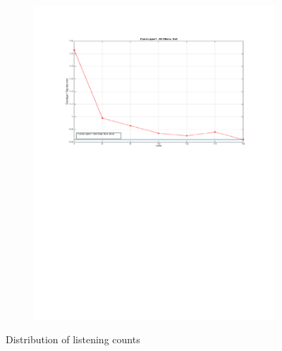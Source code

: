 \documentclass{article} %
\begin{document}
\begin{figure}[h]
\begin{subfigure}[b]{0.40\textwidth}
    \includegraphics[width=\textwidth]{images/imagesCNN_page4.pdf}
    \caption{}
  \end{subfigure}
  \caption{Distribution of listening counts}
  \label{fig:user_artist_distribution}
\end{figure}
\end{document}
